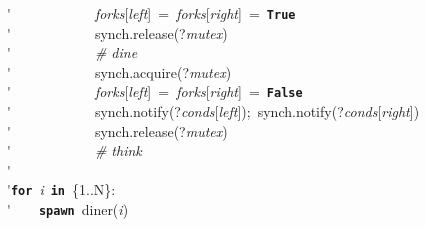 \'\>~~~~~~~~~~~~\textit{forks}[\textit{left}]~=~\textit{forks}[\textit{right}]~=~\texttt{\textbf{True}}\\

\'\>~~~~~~~~~~~~synch.release(?\textit{mutex})\\

\'\>~~~~~~~~~~~~\emph{\# dine}\\

\'\>~~~~~~~~~~~~synch.acquire(?\textit{mutex})\\

\'\>~~~~~~~~~~~~\textit{forks}[\textit{left}]~=~\textit{forks}[\textit{right}]~=~\texttt{\textbf{False}}\\

\'\>~~~~~~~~~~~~synch.notify(?\textit{conds}[\textit{left}]);~synch.notify(?\textit{conds}[\textit{right}])\\

\'\>~~~~~~~~~~~~synch.release(?\textit{mutex})\\

\'\>~~~~~~~~~~~~\emph{\# think}\\

\'\>\\

\'\>\texttt{\textbf{for}}~\textit{i}~\texttt{\textbf{in}}~\{1..N\}:\\

\'\>~~~~\texttt{\textbf{spawn}}~diner(\textit{i})